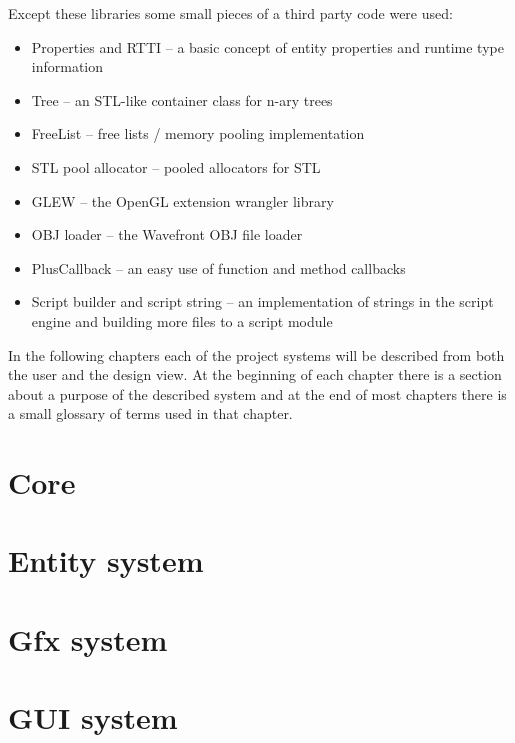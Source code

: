 \documentclass[a4paper, 12pt]{report}
\begin{document}
Except these libraries some small pieces of a third party code were used:

\begin{itemize}
  \item Properties and RTTI\cite{gpg5} -- a basic concept of entity properties and runtime type information
  \item Tree\cite{tree} -- an STL-like container class for n-ary trees
  \item FreeList\cite{gpg5} -- free lists / memory pooling implementation
  \item STL pool allocator\cite{allocator} -- pooled allocators for STL
  \item GLEW\cite{glew} -- the OpenGL extension wrangler library
  \item OBJ loader\cite{objloader} -- the Wavefront OBJ file loader
  \item PlusCallback\cite{pluscallback} -- an easy use of function and method callbacks
  \item Script builder and script string\cite{angelscript} -- an implementation of strings in the script engine and building more files to a script module
\end{itemize}

In the following chapters each of the project systems will be described from both the user and the design view. At the beginning of each chapter there is a section about a purpose of the described system and at the end of most chapters there is a small glossary of terms used in that chapter.

\chapter{Core}



\chapter{Entity system}



\chapter{Gfx system}



\chapter{GUI system}
\end{document}
